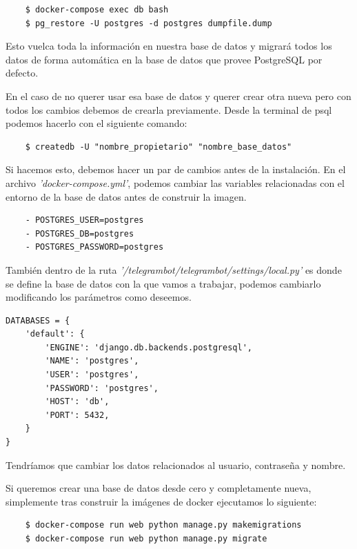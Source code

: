 \begin{verbatim}
    $ docker-compose exec db bash
    $ pg_restore -U postgres -d postgres dumpfile.dump
\end{verbatim}

Esto vuelca toda la información en nuestra base de datos y migrará todos los datos de forma automática en la base de datos que provee PostgreSQL por defecto. 

En el caso de no querer usar esa base de datos y querer crear otra nueva pero con todos los cambios debemos de crearla previamente. Desde la terminal de psql podemos hacerlo con el siguiente comando:

\begin{verbatim}
    $ createdb -U "nombre_propietario" "nombre_base_datos"
\end{verbatim}

Si hacemos esto, debemos hacer un par de cambios antes de la instalación. En el archivo \textit{'docker-compose.yml'}, podemos cambiar las variables relacionadas con el entorno de la base de datos antes de construir la imagen.

\begin{verbatim}
    - POSTGRES_USER=postgres
    - POSTGRES_DB=postgres
    - POSTGRES_PASSWORD=postgres
\end{verbatim}

También dentro de la ruta \textit{'/telegrambot/telegrambot/settings/local.py'} es donde se define la base de datos con la que vamos a trabajar, podemos cambiarlo modificando los parámetros como deseemos. 


\begin{verbatim}
DATABASES = {
    'default': {
        'ENGINE': 'django.db.backends.postgresql',
        'NAME': 'postgres',
        'USER': 'postgres',
        'PASSWORD': 'postgres',
        'HOST': 'db',
        'PORT': 5432,
    }
}
\end{verbatim}

Tendríamos que cambiar los datos relacionados al usuario, contraseña y nombre. 

Si queremos crear una base de datos desde cero y completamente nueva, simplemente tras construir la imágenes de docker ejecutamos lo siguiente:

\begin{verbatim}
    $ docker-compose run web python manage.py makemigrations
    $ docker-compose run web python manage.py migrate
\end{verbatim}

